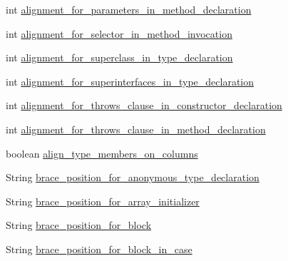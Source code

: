 \begin{DoxyCompactItemize}
\item 
int \hyperlink{classorg_1_1eclipse_1_1jdt_1_1ui_1_1tests_1_1refactoring_1_1infra_1_1TestFormatterOptions_a296189c7938cc2de4185eae642fa262f}{alignment\_\-for\_\-parameters\_\-in\_\-method\_\-declaration}
\item 
int \hyperlink{classorg_1_1eclipse_1_1jdt_1_1ui_1_1tests_1_1refactoring_1_1infra_1_1TestFormatterOptions_a1aafb21facb2e36e8cd5a7220a12ebef}{alignment\_\-for\_\-selector\_\-in\_\-method\_\-invocation}
\item 
int \hyperlink{classorg_1_1eclipse_1_1jdt_1_1ui_1_1tests_1_1refactoring_1_1infra_1_1TestFormatterOptions_a92ddf2671e63bd38dbf3786670049d9e}{alignment\_\-for\_\-superclass\_\-in\_\-type\_\-declaration}
\item 
int \hyperlink{classorg_1_1eclipse_1_1jdt_1_1ui_1_1tests_1_1refactoring_1_1infra_1_1TestFormatterOptions_ac1f06d363e36d89133ed13ae1f6d1ca4}{alignment\_\-for\_\-superinterfaces\_\-in\_\-type\_\-declaration}
\item 
int \hyperlink{classorg_1_1eclipse_1_1jdt_1_1ui_1_1tests_1_1refactoring_1_1infra_1_1TestFormatterOptions_a6ac7195004c28709aa8dfde0b504eab9}{alignment\_\-for\_\-throws\_\-clause\_\-in\_\-constructor\_\-declaration}
\item 
int \hyperlink{classorg_1_1eclipse_1_1jdt_1_1ui_1_1tests_1_1refactoring_1_1infra_1_1TestFormatterOptions_a999d060c01601151f6dc1ac6279314ca}{alignment\_\-for\_\-throws\_\-clause\_\-in\_\-method\_\-declaration}
\item 
boolean \hyperlink{classorg_1_1eclipse_1_1jdt_1_1ui_1_1tests_1_1refactoring_1_1infra_1_1TestFormatterOptions_acbdce6faf36493a002e5cedd8a44de4f}{align\_\-type\_\-members\_\-on\_\-columns}
\item 
String \hyperlink{classorg_1_1eclipse_1_1jdt_1_1ui_1_1tests_1_1refactoring_1_1infra_1_1TestFormatterOptions_abaec934dd42f369ff15711ed2566a8c9}{brace\_\-position\_\-for\_\-anonymous\_\-type\_\-declaration}
\item 
String \hyperlink{classorg_1_1eclipse_1_1jdt_1_1ui_1_1tests_1_1refactoring_1_1infra_1_1TestFormatterOptions_a6709ada91573916f167d6acad58d213a}{brace\_\-position\_\-for\_\-array\_\-initializer}
\item 
String \hyperlink{classorg_1_1eclipse_1_1jdt_1_1ui_1_1tests_1_1refactoring_1_1infra_1_1TestFormatterOptions_aaf3d8426d8dfb9405d4035e3c4bf6d03}{brace\_\-position\_\-for\_\-block}
\item 
String \hyperlink{classorg_1_1eclipse_1_1jdt_1_1ui_1_1tests_1_1refactoring_1_1infra_1_1TestFormatterOptions_ad84e930aa244c45d90bb23eb149b0182}{brace\_\-position\_\-for\_\-block\_\-in\_\-case}

\end{DoxyCompactItemize}

